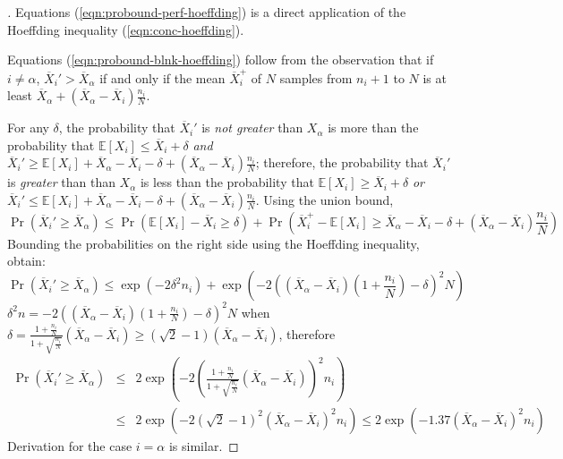 \documentclass{article}
\newcommand {\IE} {\ensuremath {\mathbb{E}}}
\begin{document}
\begin{proof}[]
Equations (\ref{eqn:probound-perf-hoeffding}) is a direct
application of the Hoeffding inequality (\ref{eqn:conc-hoeffding}).

Equations (\ref{eqn:probound-blnk-hoeffding}) follow from the
observation that if $i\ne\alpha$, $\overline X_i'>\overline X_\alpha$
if and only if the mean $\overline X_i^+$ of $N$ samples from $n_i+1$
to $N$ is at least $\overline X_\alpha+(\overline X_\alpha-\overline
X_i)\frac {n_i} N$.

For any $\delta$, the probability that $\overline X_i'$ is \textit{not
greater} than
$X_\alpha$ is more than the probability that $\IE[X_i]\le\overline
X_i+\delta$ \textit{and} $\overline X_i'\ge \IE[X_i]+\overline X_\alpha - \overline
  X_i - \delta +(\overline X_\alpha - \overline X_i)\frac {n_i} N$;
therefore, the probability that $\overline X_i'$ is \textit{greater}
than than $X_\alpha$ is less than the probability that $\IE[X_i]\ge\overline
X_i+\delta$ \textit{or} $\overline X_i'\le \IE[X_i]+\overline X_\alpha - \overline
  X_i - \delta +(\overline X_\alpha - \overline X_i)\frac {n_i} N$.
Using the union bound,
\begin{equation}
\Pr(\overline X_i'\ge \overline X_\alpha)\le
  \Pr(\IE[X_i]-\overline X_i \ge \delta) +
  \Pr(\overline X_i^+ - \IE[X_i] \ge \overline X_\alpha - \overline
  X_i - \delta +(\overline X_\alpha - \overline X_i)\frac {n_i} N)
\end{equation}
Bounding the probabilities on the right side using the Hoeffding
inequality, obtain:
\begin{equation}
\Pr(\overline X_i'\ge \overline X_\alpha)\le
  \exp(-2\delta^2n_i)+\exp\left(-2\left((\overline X_\alpha - \overline
  X_i)\left(1+\frac {n_i} N\right) - \delta\right)^2N\right)
\end{equation}
$\delta^2n = -2\left((\overline X_\alpha - \overline X_i)
(1+\frac {n_i} N) - \delta\right)^2N$ when
$\delta=\frac {1+\frac {n_i} N} {1+\sqrt {\frac {n_i} N}} (\overline X_\alpha
- \overline X_i) \ge (\sqrt 2 - 1)(\overline X_\alpha-\overline X_i)$,
therefore
\begin{eqnarray}
\Pr(\overline X_i'\ge \overline X_\alpha) 
& \le & 2\exp\left(-2\left( \frac {1+\frac {n_i} N} {1+\sqrt {\frac {n_i} N}}(\overline X_\alpha - \overline X_i)\right)^2 n_i\right)\nonumber \\
& \le & 2\exp(-2(\sqrt 2 - 1)^2(\overline X_\alpha - \overline X_i)^2n_i)
 \le 2\exp(-1.37(\overline X_\alpha - \overline X_i)^2n_i)
\end{eqnarray}
Derivation for the case $i=\alpha$ is similar.
\end{proof}
\end{document}
